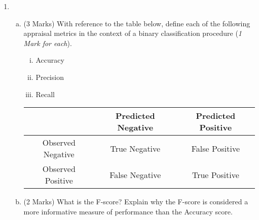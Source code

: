 \documentclass[a4paper,12pt]{article}
\begin{document}
\begin{enumerate}
\begin{enumerate}[(a)]
\begin{enumerate}[(i)]
%
\end{enumerate}
	
%		
%		


	\end{enumerate}
\newpage
	\item 


 
	\begin{enumerate}[(a)]



		\item (3 Marks) With reference to the table below, define each of the following appraisal metrics in the context of a binary classification procedure (\textit{1 Mark for each}).
		\begin{enumerate}[(i)]
			\item Accuracy
			\item Precision
			\item Recall
		\end{enumerate}
		\begin{center}
		\begin{tabular}{|c|c|c|}
			\hline  & Predicted Negative & Predicted Positive \\ 
			\hline Observed Negative & True Negative & False Positive \\ 
			\hline Observed Positive & False Negative & True Positive \\ 
			\hline 
		\end{tabular} 
	\end{center}
\bigskip
		\item (2 Marks) What is the F-score? Explain why the F-score is considered a more informative measure of performance than the Accuracy score.
		

\end{enumerate}
\end{enumerate}
\end{document}
